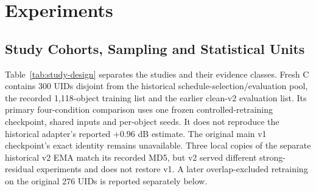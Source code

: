 \documentclass[times,twocolumn,final]{elsarticle}
\providecommand{\DIFadd}[1]{{\protect\color{blue} \sf #1}} %
\providecommand{\DIFaddbegin}{} %
\providecommand{\DIFaddend}{} %
\providecommand{\DIFdelbegin}{} %
\providecommand{\DIFdelend}{} %
\begin{document}
\section{Experiments}
\label{sec:experiments}

\DIFdelbegin %
\DIFdelend \DIFaddbegin \subsection{Study Cohorts, Sampling and Statistical Units}
\DIFaddend \label{subsec:setup}

\DIFdelbegin %
\DIFdelend \DIFaddbegin \DIFadd{Table~\ref{tab:study-design} separates the studies and their evidence classes. Fresh C contains 300 UIDs disjoint from the historical schedule-selection/evaluation pool, the recorded 1,118-object training list and the earlier clean-v2 evaluation list. Its primary four-condition comparison uses one frozen controlled-retraining checkpoint, shared inputs and per-object seeds. It does not reproduce the historical adapter's reported $+0.96$ dB estimate. The original main v1 checkpoint's exact identity remains unavailable. Three local copies of the separate historical v2 EMA match its recorded MD5, but v2 served different strong-residual experiments and does not restore v1. A later overlap-excluded retraining on the original 276 UIDs is reported separately below.
}\DIFaddend 
\end{document}
